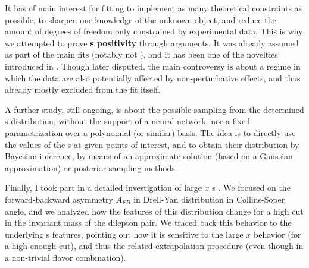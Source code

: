 It has of main interest for fitting to implement as many theoretical
constraints as possible, to sharpen our knowledge of the unknown object, and
reduce the amount of degrees of freedom only constrained by experimental data.
This is why we attempted to prove \textbf{\pdf{}s positivity}
 through \pqcd{} arguments.
It was already assumed as part of the main \pdf{} fits (notably not
), and it has been one of the novelties introduced in .
Though later disputed, the main controversy is about a regime in which the data
are also potentially affected by non-perturbative effects, and thus already
mostly excluded from the fit itself.

A further study, still ongoing, is about the possible sampling from the
determined \pdf{}s distribution, without the support of a neural network, nor a
fixed parametrization over a polynomial (or similar) basis.
The idea is to directly use the values of the \pdf{}s at given points of
interest, and to obtain their distribution by Bayesian inference, by means of
an approximate solution (based on a Gaussian approximation) or posterior
sampling methods.

Finally, I took part in a detailed investigation of large $x$ \pdf{}s
.
We focused on the forward-backward asymmetry $A_{FB}$ in Drell-Yan distribution
in Collins-Soper angle, and we analyzed how the features of this distribution
change for a high cut in the invariant mass of the dilepton pair.
We traced back this behavior to the underlying \pdf{}s features, pointing out
how it is sensitive to the large $x$ behavior (for a high enough cut), and thus
the related extrapolation procedure (even though in a non-trivial flavor
combination).
